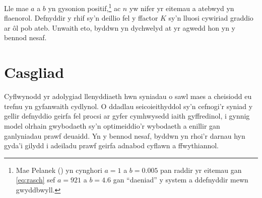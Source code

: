 Lle mae $a$ a $b$ yn gysonion positif,\footnote{Mae Pelanek (\cite{pelanek_applications_2016}) yn cynghori $a=1$ a $b=0.005$ pan raddir yr eitemau gan \ref{eq:rasch} sef $a=921$ a $b=4.6$ gan ``daeniad'' y system a ddefnyddir mewn gwyddbwyll.} ac $n$ yw nifer yr eitemau a atebwyd yn flaenorol. Defnyddir y rhif sy'n deillio fel y ffactor $K$ sy'n lluosi cywiriad graddio ar ôl pob ateb. Unwaith eto, byddwn yn dychwelyd at yr agwedd hon yn y bennod nesaf.

\section{Casgliad}
Cyflwynodd yr adolygiad llenyddiaeth hwn syniadau o sawl maes a cheisiodd eu trefnu yn gyfanwaith cydlynol. O ddadlau seicoieithyddol sy'n cefnogi'r syniad y gellir defnyddio geirfa fel procsi ar gyfer cymhwysedd iaith gyffredinol, i gynnig model olrhain gwybodaeth sy'n optimeiddio'r wybodaeth a enillir gan ganlyniadau prawf deuaidd. Yn y bennod nesaf, byddwn yn rhoi'r darnau hyn gyda'i gilydd i adeiladu prawf geirfa adnabod cyflawn a ffwythiannol.